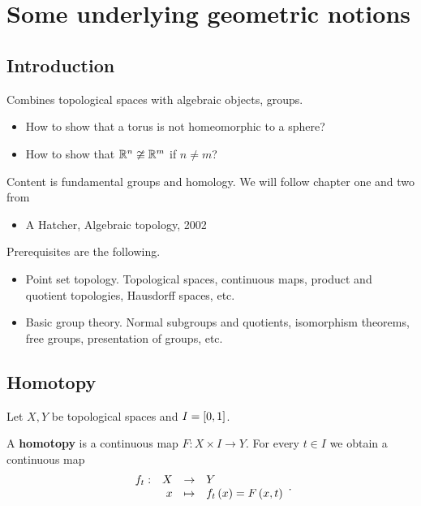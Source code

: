 \def\module{M3P21 Geometry II: Algebraic Topology}
\def\lecturer{Dr Christian Urech}
\def\term{Spring 2019}

\def\thm{section}







\section{Some underlying geometric notions}

\subsection{Introduction}


Combines topological spaces with algebraic objects, groups.
\begin{itemize}
\item How to show that a torus is not homeomorphic to a sphere?
\item How to show that $ \R^n \ncong \R^m $ if $ n \ne m $?
\end{itemize}

Content is fundamental groups and homology. We will follow chapter one and two from
\begin{itemize}
\item A Hatcher, Algebraic topology, 2002
\end{itemize}

Prerequisites are the following.
\begin{itemize}
\item Point set topology. Topological spaces, continuous maps, product and quotient topologies, Hausdorff spaces, etc.
\item Basic group theory. Normal subgroups and quotients, isomorphism theorems, free groups, presentation of groups, etc.
\end{itemize}

\subsection{Homotopy}

Let $ X, Y $ be topological spaces and $ I = \sb{0, 1} $.

\begin{definition*}
A \textbf{homotopy} is a continuous map $ F : X \times I \to Y $. For every $ t \in I $ we obtain a continuous map
$$ \function[f_t]{X}{Y}{x}{f_t\rb{x} = F\rb{x, t}}. $$
\end{definition*}


